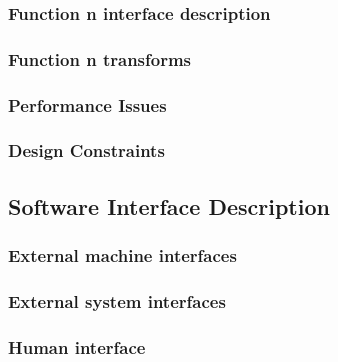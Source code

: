 \documentclass{article}
\begin{document}
\subsubsection{Function n interface description}

\subsubsection{Function n transforms}





\subsubsection{Performance Issues}

\subsubsection{Design Constraints}

\subsection{Software Interface Description}

\subsubsection{External machine interfaces}

\subsubsection{External system interfaces}

\subsubsection{Human interface}
\end{document}
